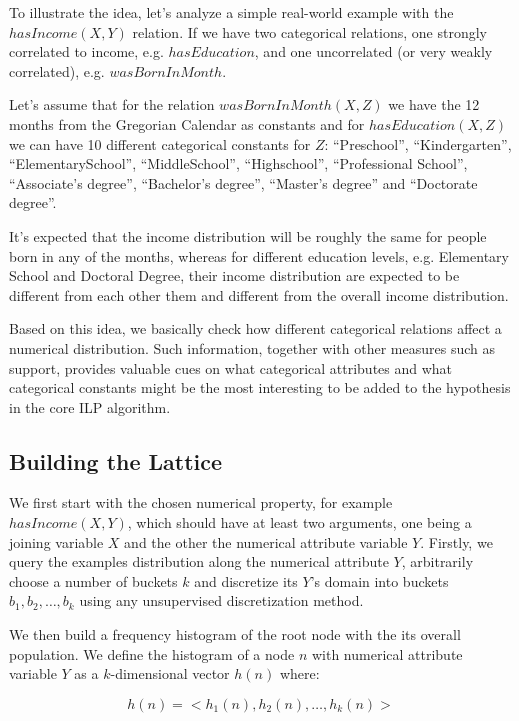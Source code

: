To illustrate the idea, let's analyze a simple real-world example with the $hasIncome(X,Y)$ relation. If we have two
categorical relations, one strongly correlated to income, e.g. $hasEducation$, and one uncorrelated (or very weakly
correlated), e.g. $wasBornInMonth$.

Let's assume that for the relation $wasBornInMonth(X,Z)$ we have the 12 months from the Gregorian Calendar as
constants and for $hasEducation(X,Z)$ we can have 10 different categorical constants for $Z$: ``Preschool'',
``Kindergarten'', ``ElementarySchool'', ``MiddleSchool'', ``Highschool'', ``Professional School'', ``Associate's
degree'', ``Bachelor's degree'', ``Master's degree'' and ``Doctorate degree''. 

It's expected that the income distribution will be roughly the same for people born in any of the months, whereas
for different education levels, e.g. Elementary School and Doctoral Degree, their income distribution are expected to
be
different from each other them and different from the overall income distribution.

Based on this idea, we basically check how different categorical relations affect a numerical distribution. Such
information, together with other measures such as support, provides valuable cues on what categorical attributes and
what
categorical constants might be the most interesting to be added to the hypothesis in the core ILP algorithm.

\subsection{Building the Lattice}

We first start with the chosen numerical property, for example $hasIncome(X,Y)$, which should have at least two
arguments, one being a joining variable $X$ and the other the numerical attribute variable $Y$. Firstly, we query the
examples distribution along the numerical attribute $Y$, arbitrarily choose a number of buckets $k$ and discretize
its $Y$'s domain into buckets $b_1, b_2, \dots, b_k$ using any unsupervised discretization method. 

We then build a frequency histogram of the root node with the its overall population. We define the histogram of a
node
$n$ with numerical attribute variable $Y$ as a $k$-dimensional vector $h(n)$ where:

\begin{equation}
 h(n)=<h_1(n),h_2(n),\ldots,h_k(n)>
\end{equation}

